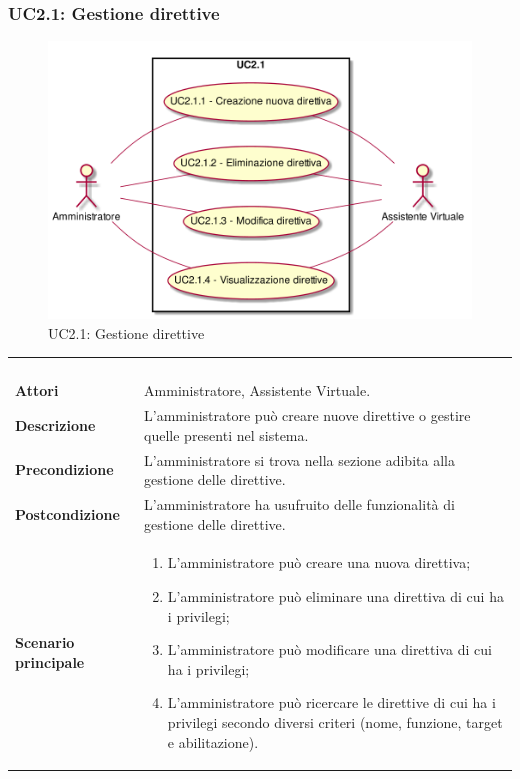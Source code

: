 \newpage\subsubsection{UC2.1: Gestione direttive}
\label{UC2.1}
\begin{figure}[h]
\centering
\includegraphics[width=\textwidth,height=\textheight,keepaspectratio]{images/UseCaseUC21.png}
\caption{UC2.1: Gestione direttive}
\end{figure}
\begin{longtable}{l|p{10cm}}
\rowcolor[gray]{0.8} \multicolumn{2}{c}{} \\
\rowcolor[gray]{0.8} \multicolumn{2}{c}{\textbf{UC2.1 - Gestione direttive}} \\
\rowcolor[gray]{0.8} \multicolumn{2}{c}{} \\
\hline
&\\
\textbf{Attori} & Amministratore, Assistente Virtuale.\\[7pt]
\textbf{Descrizione} & L'amministratore può creare nuove direttive o gestire quelle presenti nel sistema.\\[7pt]
\textbf{Precondizione} & L'amministratore si trova nella sezione adibita alla gestione delle direttive.\\[7pt]
\textbf{Postcondizione} & L'amministratore ha usufruito delle funzionalità di gestione delle direttive.\\[7pt]
\textbf{Scenario principale} &\begin{enumerate}
\item  L'amministratore può creare una nuova direttiva;
\item  L'amministratore può eliminare una direttiva di cui ha i privilegi;
\item  L'amministratore può modificare una direttiva di cui ha i privilegi;
\item  L'amministratore può ricercare le direttive di cui ha i privilegi secondo diversi criteri (nome, funzione, target e abilitazione).
\end{enumerate}
\\[7pt]\hline
\end{longtable}

